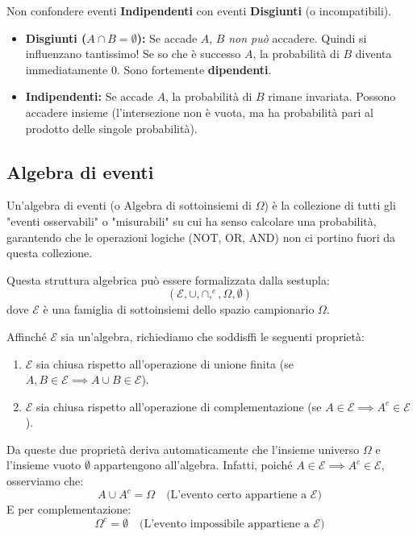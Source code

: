 Non confondere eventi \textbf{Indipendenti} con eventi \textbf{Disgiunti} (o incompatibili).

\begin{itemize}
    \item \textbf{Disgiunti ($A \cap B = \emptyset$):} Se accade $A$, $B$ \emph{non può} accadere. Quindi si influenzano tantissimo! Se so che è successo $A$, la probabilità di $B$ diventa immediatamente 0. Sono fortemente \textbf{dipendenti}.
    
    \item \textbf{Indipendenti:} Se accade $A$, la probabilità di $B$ rimane invariata. Possono accadere insieme (l'intersezione non è vuota, ma ha probabilità pari al prodotto delle singole probabilità).
\end{itemize}

\subsection{Algebra di eventi}
Un'algebra di eventi (o Algebra di sottoinsiemi di $\Omega$) è la collezione di tutti gli "eventi osservabili" o "misurabili" su cui ha senso calcolare una probabilità, garantendo che le operazioni logiche (NOT, OR, AND) non ci portino fuori da questa collezione.

Questa struttura algebrica può essere formalizzata dalla sestupla:
\[ (\mathcal{E}, \cup, \cap, ^c, \Omega, \emptyset) \]
dove $\mathcal{E}$ è una famiglia di sottoinsiemi dello spazio campionario $\Omega$.

Affinché $\mathcal{E}$ sia un'algebra, richiediamo che soddisffi le seguenti proprietà:
\begin{enumerate}
    \item $\mathcal{E}$ sia chiusa rispetto all'operazione di unione finita (se $A, B \in \mathcal{E} \implies A \cup B \in \mathcal{E}$).
    \item $\mathcal{E}$ sia chiusa rispetto all'operazione di complementazione (se $A \in \mathcal{E} \implies A^c \in \mathcal{E}$).
\end{enumerate}

Da queste due proprietà deriva automaticamente che l'insieme universo $\Omega$ e l'insieme vuoto $\emptyset$ appartengono all'algebra. Infatti, poiché $A \in \mathcal{E} \implies A^c \in \mathcal{E}$, osserviamo che:
\[ A \cup A^c = \Omega \quad \text{(L'evento certo appartiene a } \mathcal{E}) \]
E per complementazione:
\[ \Omega^c = \emptyset \quad \text{(L'evento impossibile appartiene a } \mathcal{E}) \]

